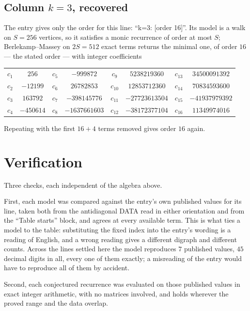 \documentclass[11pt,a4paper]{article}
\theoremstyle{plain}
\theoremstyle{definition}
\begin{document}
\subsection*{Column $k=3$, recovered}
The entry gives only the order for this line: ``k=3: [order 16]''. Its model is a walk on
$S=256$ vertices, so it satisfies a monic recurrence of order at most $S$;
Berlekamp--Massey on $2S=512$ exact terms returns the minimal one, of order
$16$ --- the stated order --- with integer coefficients
\begin{center}\small\begin{tabular}{cccccccc}
$c_{1}$ & $256$ & $c_{5}$ & $-999872$ & $c_{9}$ & $5238219360$ & $c_{13}$ & $34500091392$ \\
$c_{2}$ & $-12199$ & $c_{6}$ & $26782853$ & $c_{10}$ & $12853712360$ & $c_{14}$ & $70834593600$ \\
$c_{3}$ & $163792$ & $c_{7}$ & $-398145776$ & $c_{11}$ & $-27723613504$ & $c_{15}$ & $-41937979392$ \\
$c_{4}$ & $-450614$ & $c_{8}$ & $-1637661603$ & $c_{12}$ & $-38172377104$ & $c_{16}$ & $11349974016$ \\
\end{tabular}\end{center}
Repeating with the first $16+4$ terms removed gives order $16$ again.

\section{Verification}

Three checks, each independent of the algebra above.

First, each model was compared against the entry's own published values for its line, taken
both from the antidiagonal DATA read in either orientation and from the ``Table starts''
block, and agrees at every available term. This is what ties a model to the table:
substituting the fixed index into the entry's wording is a reading of English, and a wrong
reading gives a different digraph and different counts. Across the lines settled here the
model reproduces $7$ published values, $45$ decimal digits in all, every one of
them exactly; a misreading of the entry would have to reproduce all of them by accident.

Second, each conjectured recurrence was evaluated on those published values in exact
integer arithmetic, with no matrices involved, and holds wherever the proved range and the
data overlap.
\end{document}
